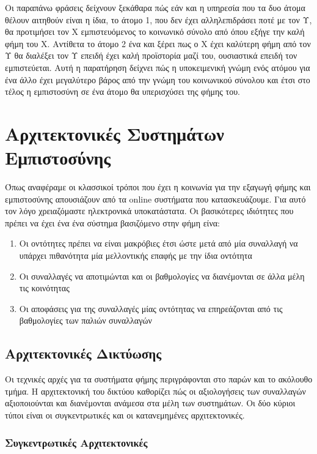 Οι παραπάνω φράσεις δείχνουν ξεκάθαρα πώς εάν και η υπηρεσία που τα δυο άτομα θέλουν αιτηθούν είναι η ίδια, το άτομο 1, που δεν έχει αλληλεπιδράσει ποτέ με τον Υ, θα προτιμήσει τον Χ εμπιστευόμενος το κοινωνικό σύνολο από όπου εξήγε την καλή φήμη του Χ. Αντίθετα το άτομο 2 ένα και ξέρει πως ο Χ έχει καλύτερη φήμη από τον Υ θα διαλέξει τον Υ επειδή έχει καλή προϊστορία μαζί του, ουσιαστικά επειδή τον εμπιστεύεται. Αυτή η παρατήρηση δείχνει πώς η υποκειμενική γνώμη ενός ατόμου για ένα άλλο έχει μεγαλύτερο βάρος από την γνώμη του κοινωνικού σύνολου και έτσι στο τέλος η εμπιστοσύνη σε ένα άτομο θα υπερισχύσει της φήμης του.

\section{Αρχιτεκτονικές Συστημάτων Εμπιστοσύνης}

Όπως αναφέραμε οι κλασσικοί τρόποι που έχει η κοινωνία για την εξαγωγή φήμης και εμπιστοσύνης απουσιάζουν από τα online συστήματα που κατασκευάζουμε. Για αυτό τον λόγο χρειαζόμαστε ηλεκτρονικά υποκατάστατα. Οι βασικότερες ιδιότητες που πρέπει να έχει ένα ένα σύστημα βασιζόμενο στην φήμη είνα: %

\begin{enumerate}
\item Οι οντότητες πρέπει να είναι μακρόβιες έτσι ώστε μετά από μία συναλλαγή να υπάρχει πιθανότητα μία μελλοντικής επαφής με την ίδια οντότητα

\item Οι συναλλαγές να αποτιμώνται και οι βαθμολογίες να διανέμονται σε άλλα μέλη τις κοινότητας

\item Οι αποφάσεις για της συναλλαγές μίας οντότητας να επηρεάζονται από τις βαθμολογίες των παλιών συναλλαγών
\end{enumerate}

\subsection{Αρχιτεκτονικές Δικτύωσης}

Οι τεχνικές αρχές για τα συστήματα φήμης περιγράφονται στο παρών και το ακόλουθο τμήμα. Η αρχιτεκτονική του δικτύου καθορίζει πώς οι αξιολογήσεις των συναλλαγών αξιοποιούνται και διανέμονται ανάμεσα στα μέλη των συστημάτων. Οι δύο κύριοι τύποι είναι οι συγκεντρωτικές και οι κατανεμημένες αρχιτεκτονικές.%
\subsubsection{Συγκεντρωτικές Αρχιτεκτονικές}

